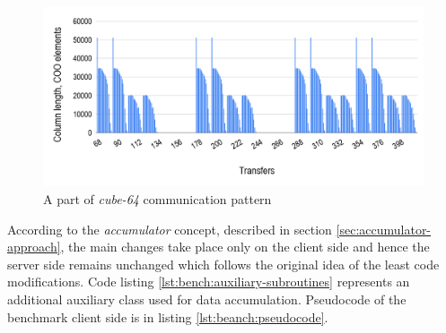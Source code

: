 \begin{figure}[htpb]
  \centering
  \includegraphics[width=1.0\textwidth]{figures/chapter-3/communication-pattern.png}
  \caption{A part of \textit{cube-64} communication pattern} \label{fig:communication-pattern}
\end{figure}


According to the \textit{accumulator} concept, described in section \ref{sec:accumulator-approach}, the main changes take place only on the client side and hence the server side remains unchanged which follows the original idea of the least code modifications. Code listing \ref{lst:bench:auxiliary-subroutines} represents an additional auxiliary class used for data accumulation. Pseudocode of the benchmark client side is in listing \ref{lst:beanch:pseudocode}.\\ 


